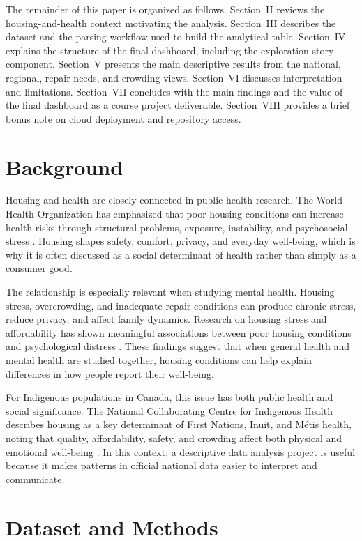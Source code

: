 \documentclass[conference]{IEEEtran}
\begin{document}
The remainder of this paper is organized as follows. Section~II reviews the housing-and-health context motivating the analysis. Section~III describes the dataset and the parsing workflow used to build the analytical table. Section~IV explains the structure of the final dashboard, including the exploration-story component. Section~V presents the main descriptive results from the national, regional, repair-needs, and crowding views. Section~VI discusses interpretation and limitations. Section~VII concludes with the main findings and the value of the final dashboard as a course project deliverable. Section~VIII provides a brief bonus note on cloud deployment and repository access.

\section{Background}

Housing and health are closely connected in public health research. The World Health Organization has emphasized that poor housing conditions can increase health risks through structural problems, exposure, instability, and psychosocial stress \cite{who2018}. Housing shapes safety, comfort, privacy, and everyday well-being, which is why it is often discussed as a social determinant of health rather than simply as a consumer good.

The relationship is especially relevant when studying mental health. Housing stress, overcrowding, and inadequate repair conditions can produce chronic stress, reduce privacy, and affect family dynamics. Research on housing stress and affordability has shown meaningful associations between poor housing conditions and psychological distress \cite{bentley2012}. These findings suggest that when general health and mental health are studied together, housing conditions can help explain differences in how people report their well-being.

For Indigenous populations in Canada, this issue has both public health and social significance. The National Collaborating Centre for Indigenous Health describes housing as a key determinant of First Nations, Inuit, and M\'etis health, noting that quality, affordability, safety, and crowding affect both physical and emotional well-being \cite{nccih2017}. In this context, a descriptive data analysis project is useful because it makes patterns in official national data easier to interpret and communicate.

\section{Dataset and Methods}
\end{document}
